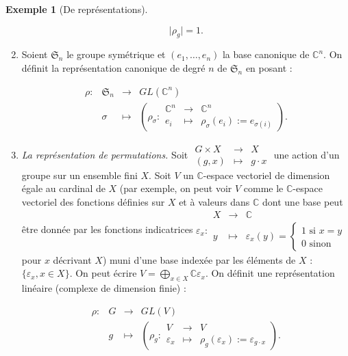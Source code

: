 \documentclass[french]{book}
\theoremstyle{definition}
\newtheorem*{protoexemple}{Exemple}
\newenvironment{exemple}
    {\colorlet{shadecolor}{gray!10}\begin{shaded}\begin{protoexemple}}
    {\end{protoexemple}\end{shaded}}
\begin{document}
\begin{exemple}[De représentations]
\begin{enumerate}
      \[
      \lvert \rho_g \rvert = 1.
      \]

      \item Soient $\mathfrak{S}_n$ le groupe symétrique et $(e_1, \dots, e_n)$ la base canonique de $\mathbb{C} ^{n}$. On définit la représentation canonique de degré $n$ de $\mathfrak{S}_n$ en posant :

      \[\begin{matrix}
      \rho : & \mathfrak{S}_n & \longrightarrow & GL(\mathbb{C} ^{n}) \\
      \ & \sigma & \longmapsto & \left( \rho _{\sigma} : \begin{matrix}
      \mathbb{C} ^{n} & \longrightarrow & \mathbb{C}^{n} \\
      e_i & \longmapsto & \rho _{\sigma}(e_i) := e _{\sigma(i)}
      \end{matrix}\right).
      \end{matrix}\]





      \item \emph{La représentation de permutations.} Soit \(\begin{matrix}
       G \times X & \longrightarrow & X \\
       (g,x) & \longmapsto & g \cdot x
     \end{matrix}\) une action d'un groupe sur un ensemble fini \(X\). Soit \(V\) un \(\mathbb{C}\)-espace vectoriel de dimension égale au cardinal de \(X\) (par exemple, on peut voir \(V\) comme le \(\mathbb{C}\)-espace vectoriel des fonctions définies sur \(X\) et à valeurs dans \(\mathbb{C}\) dont une base peut être donnée par les fonctions indicatrices \( \varepsilon_x : \begin{matrix}
       X & \longrightarrow & \mathbb{C} \\
       y & \longmapsto & \varepsilon_x(y) = \begin{cases}
        1 \text{ si } x=y \\
        0 \text{ sinon }
      \end{cases}
      \end{matrix}\) pour \(x\) décrivant \(X\)) muni d'une base indexée par les éléments de \(X\) : \(\{ \varepsilon_x, x \in X \} \). On peut écrire \(V = \bigoplus _{x \in X} \mathbb{C} \varepsilon_x\). On définit une représentation linéaire (complexe de dimension finie) :

      \[\begin{matrix}
      \rho : & G & \longrightarrow & GL(V) \\
      \ & g & \longmapsto &\left( \rho_g : \begin{matrix}
      V & \longrightarrow & V \\
      \varepsilon_x & \longmapsto & \rho_g(\varepsilon_x) := \varepsilon _{g \cdot x}
      \end{matrix} \right).
      \end{matrix}\]


\end{enumerate}
\end{exemple}
\end{document}
